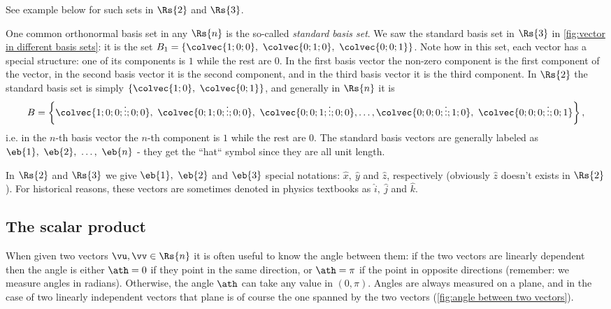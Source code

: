 See example below for such sets in $\Rs{2}$ and $\Rs{3}$.

One common orthonormal basis set in any $\Rs{n}$ is the so-called \emph{standard basis set}. We saw the standard basis set in $\Rs{3}$ in \autoref{fig:vector in different basis sets}: it is the set $B_{1}=\left\{ \colvec{1;0;0},\ \colvec{0;1;0},\ \colvec{0;0;1} \right\}$. Note how in this set, each vector has a special structure: one of its components is $1$ while the rest are $0$. In the first basis vector the non-zero component is the first component of the vector, in the second basis vector it is the second component, and in the third basis vector it is the third component. In $\Rs{2}$ the standard basis set is simply $\left\{ \colvec{1;0},\ \colvec{0;1} \right\}$, and generally in $\Rs{n}$ it is
\begin{equation}
	B = \left\{ \colvec{1;0;0;\vdots;0;0},\ \colvec{0;1;0;\vdots;0;0},\ \colvec{0;0;1;\vdots;0;0}, \dots, \colvec{0;0;0;\vdots;1;0},\ \colvec{0;0;0;\vdots;0;1} \right\},
	\label{eq:std basis set}
\end{equation}
i.e. in the $n$-th basis vector the $n$-th component is $1$ while the rest are $0$. The standard basis vectors are generally labeled as $\eb{1},\ \eb{2},\ \dots,\ \eb{n}$ - they get the ``hat`` symbol since they are all unit length.

In $\Rs{2}$ and $\Rs{3}$ we give $\eb{1},\ \eb{2}$ and $\eb{3}$ special notations: $\hat{x},\ \hat{y}$ and $\hat{z}$, respectively (obviously $\hat{z}$ doesn't exists in $\Rs{2}$). For historical reasons, these vectors are sometimes denoted in physics textbooks as $\hat{i},\ \hat{j}$ and $\hat{k}$.

\subsection{The scalar product}
When given two vectors $\vu,\vv\in\Rs{n}$ it is often useful to know the angle between them: if the two vectors are linearly dependent then the angle is either $\ath=0$ if they point in the same direction, or $\ath=\pi$ if the point in opposite directions (remember: we measure angles in radians). Otherwise, the angle $\ath$ can take any value in $(0,\pi)$. Angles are always measured on a plane, and in the case of two linearly independent vectors that plane is of course the one spanned by the two vectors (\autoref{fig:angle between two vectors}).

